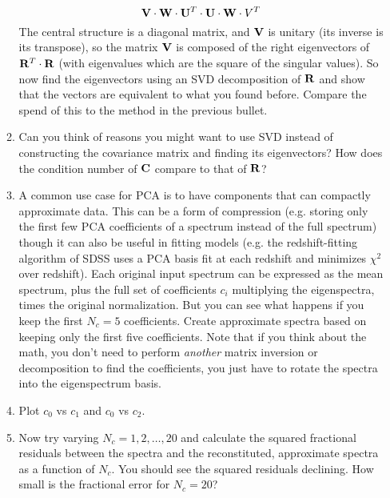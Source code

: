 \documentclass[11pt, preprint]{aastex}
\begin{document}
\begin{enumerate}
\begin{enumerate}
\begin{equation}
         {\bf V}\cdot{\bf W}\cdot{\bf U}^T\cdot{\bf U}\cdot{\bf W}\cdot{V}^T
       \end{equation}
       The central structure is a diagonal matrix, and ${\bf V}$ is
       unitary (its inverse is its transpose), so the matrix ${\bf V}$
       is composed of the right eigenvectors of
       ${\bf R}^T\cdot{\bf R}$ (with eigenvalues which are the square
       of the singular values). So now find the eigenvectors using an
       SVD decomposition of ${\bf R}$ and show that the vectors are
       equivalent to what you found before. Compare the spend of this
       to the method in the previous bullet.
    \item Can you think of reasons you might want to use SVD instead
      of constructing the covariance matrix and finding its
      eigenvectors? How does the condition number of ${\bf C}$ compare
      to that of ${\bf R}$?
     \item A common use case for PCA is to have components that can
       compactly approximate data. This can be a form of compression
       (e.g. storing only the first few PCA coefficients of a spectrum
       instead of the full spectrum) though it can also be useful in
       fitting models (e.g. the redshift-fitting algorithm of SDSS
       uses a PCA basis fit at each redshift and minimizes $\chi^2$
       over redshift). Each original input spectrum can be expressed
       as the mean spectrum, plus the full set of coefficients $c_i$
       multiplying the eigenspectra, times the original
       normalization. But you can see what happens if you keep the
       first $N_c=5$ coefficients. Create approximate spectra based on
       keeping only the first five coefficients. Note that if you
       think about the math, you don't need to perform {\it another}
       matrix inversion or decomposition to find the coefficients, you
       just have to rotate the spectra into the eigenspectrum basis.
     \item Plot $c_0$ vs $c_1$ and $c_0$ vs $c_2$.
     \item Now try varying $N_c =1,2,\ldots, 20$ and calculate the
       squared fractional residuals between the spectra and the
       reconstituted, approximate spectra as a function of $N_c$. You
       should see the squared residuals declining. How small is the
       fractional error for $N_c =20$?
  \end{enumerate}
\end{enumerate}
\end{document}
